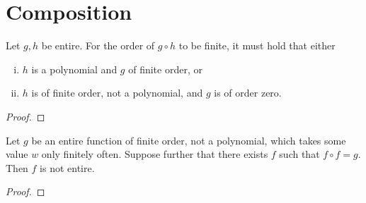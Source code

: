 \chapter{Composition}
\label{ch:composition}

\begin{theorem}[Pólya]
    Let $g, h$ be entire. For the order of $g \circ h$ to be finite, it must hold that either
    \begin{enumerate}[i.]
        \item $h$ is a polynomial and $g$ of finite order, or
        \item $h$ is of finite order, not a polynomial, and $g$ is of order zero.
    \end{enumerate}
\end{theorem}

\begin{proof}
\end{proof}

\begin{theorem}
    Let $g$ be an entire function of finite order, not a polynomial, which takes some value $w$ only finitely often. Suppose further that there exists $f$ such that $f \circ f = g$. Then $f$ is not entire.
\end{theorem}

\begin{proof}
\end{proof}

\begin{example}
\end{example}